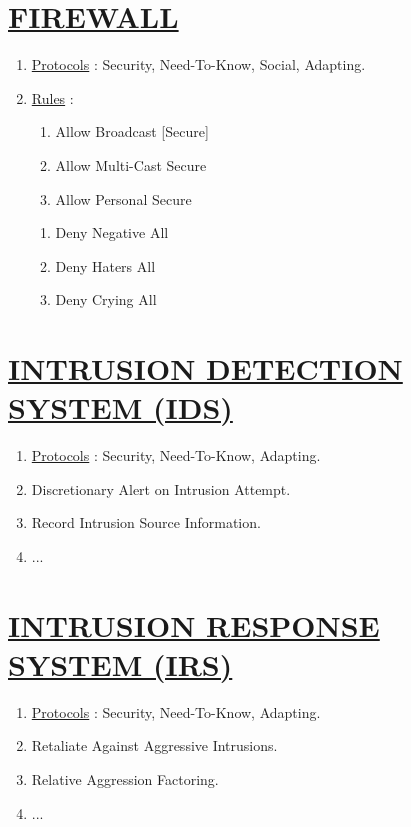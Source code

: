 \documentclass[11pt]{article}
\begin{document}
\section*{\ul{FIREWALL}}
\begin{enumerate}
	\item[] \ul{Protocols} : Security, Need-To-Know, Social, Adapting.

	\item[] \ul{Rules} :
	\begin{enumerate}
		\item[] Allow Broadcast [Secure]
		\item[] Allow Multi-Cast Secure
		\item[] Allow Personal Secure
	\end{enumerate}

	\begin{enumerate}
		\item[] Deny Negative All
		\item[] Deny Haters All
		\item[] Deny Crying All
	\end{enumerate}
	
\end{enumerate}


\section*{\ul{INTRUSION DETECTION SYSTEM (IDS)}}
\begin{enumerate}
	\item[] \ul{Protocols} : Security, Need-To-Know, Adapting.
	\item[] Discretionary Alert on Intrusion Attempt.
	\item[] Record Intrusion Source Information.
	\item[] ...
\end{enumerate}


\section*{\ul{INTRUSION RESPONSE SYSTEM (IRS)}}
\begin{enumerate}
	\item[] \ul{Protocols} : Security, Need-To-Know, Adapting.
	\item[] Retaliate Against Aggressive Intrusions.
	\item[] Relative Aggression Factoring.
	\item[] ...
\end{enumerate}
\end{document}
